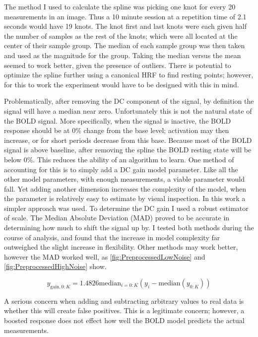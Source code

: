 The method I used to calculate the spline was picking one knot for every 20
measurements in an image. Thus a 10 minute session at a repetition time of 
2.1 seconds would have 19 knots. The knot first and last knots were each 
given half the number of samples as the rest of the knots; which were all 
located at the center of their sample group. The median of each sample group
was then taken and used as the magnitude for the group. Taking the median 
versus the mean seemed to work better, given the presence of outliers. 
There is potential to optimize the spline further using a canonical 
HRF to find resting points; however, for this to work the experiment would have
to be designed with this in mind. 

Problematically, after removing the DC component of the signal,
by definition the signal will have a median near zero. 
Unfortunately this is not the natural state of the BOLD signal. More specifically,
when the signal is inactive, the BOLD response should be at 0\% change from
the base level; activation may then increase, or for short periods decrease from this base.
Because most of the BOLD signal is above baseline, after removing the spline
the BOLD resting state will be below 0\%.  This reduces the ability of an algorithm to learn.
One method of accounting for this is to simply add a DC gain model parameter.
Like all the other model parameters, with enough measurements, a viable
parameter would fall. Yet adding another dimension increases the
complexity of the model, when the parameter is relatively easy to estimate
by visual inspection.  In this work a simpler approach was used. To determine
the DC gain I used a robust estimator of scale. The Median Absolute Deviation (MAD)
proved to be accurate in determining how much to shift the signal up
by. I tested both methods during the course of analysis, and found that the increase 
in model complexity far outweighed the slight increase in flexibility. Other
methods may work better, however the MAD worked well, 
as \autoref{fig:PreprocessedLowNoise} and \autoref{fig:PreprocessedHighNoise} show. 

\begin{equation}
y_{\text{gain}, 0:K} = 1.4826\text{median}_{i=0:K}(y_i - \text{median}(y_{0:K}))
\label{eq:mad}
\end{equation}

A serious concern when adding and subtracting arbitrary values to 
real data is whether this will create false positives. This is a legitimate
concern; however, a boosted response does not effect how well the BOLD model 
predicts the actual measurements. 

